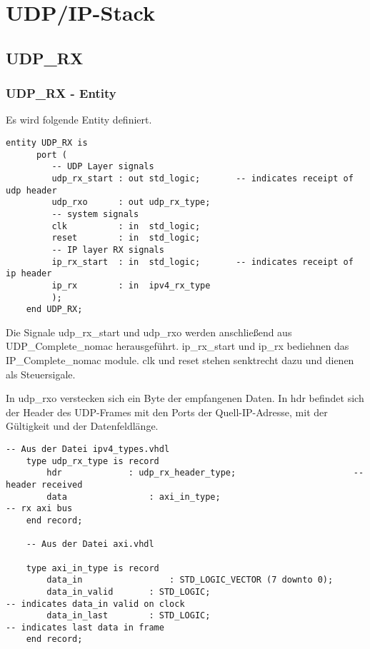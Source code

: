 \chapter{UDP/IP-Stack}

\section{UDP_RX}

\subsection{UDP_RX - Entity}
Es wird folgende Entity definiert.
	\begin{lstlisting}[style=myVHDL]
	entity UDP_RX is
	  port (
		 -- UDP Layer signals
		 udp_rx_start : out std_logic;       -- indicates receipt of udp header
		 udp_rxo      : out udp_rx_type;
		 -- system signals
		 clk          : in  std_logic;
		 reset        : in  std_logic;
		 -- IP layer RX signals
		 ip_rx_start  : in  std_logic;       -- indicates receipt of ip header
		 ip_rx        : in  ipv4_rx_type
		 );                  
	end UDP_RX;
	\end{lstlisting}

Die Signale udp_rx_start und udp_rxo werden anschließend aus UDP_Complete_nomac herausgeführt.
ip_rx_start und ip_rx bediehnen das IP_Complete_nomac module.
clk und reset stehen senktrecht dazu und dienen als Steuersigale.

In udp_rxo verstecken sich ein Byte der empfangenen Daten.
In hdr befindet sich der Header des UDP-Frames mit den Ports der Quell-IP-Adresse, mit der Gültigkeit und der Datenfeldlänge. 
	\begin{lstlisting}[style=myVHDL]
	-- Aus der Datei ipv4_types.vhdl
 	type udp_rx_type is record
		hdr				: udp_rx_header_type;						-- header received
		data				: axi_in_type;									-- rx axi bus
	end record;

	-- Aus der Datei axi.vhdl

	type axi_in_type is record
		data_in 				: STD_LOGIC_VECTOR (7 downto 0);
		data_in_valid 		: STD_LOGIC;								-- indicates data_in valid on clock
		data_in_last 		: STD_LOGIC;								-- indicates last data in frame
	end record;
	\end{lstlisting}

